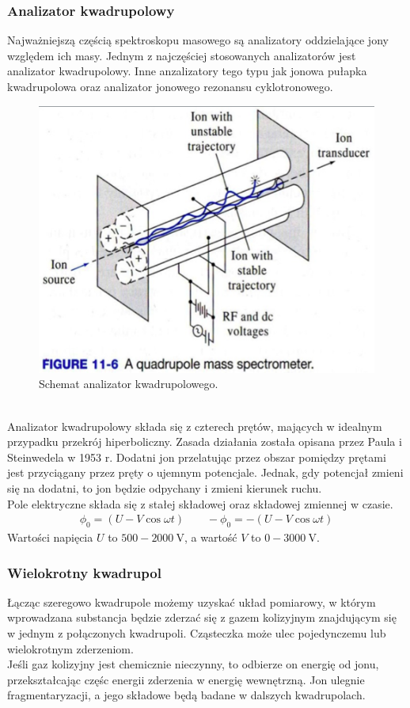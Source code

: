\documentclass[paper=a4, fontsize=12pt]{scrartcl}
\begin{document}
\subsubsection{Analizator kwadrupolowy}
Najważniejszą częścią spektroskopu masowego są analizatory oddzielające jony względem ich masy. Jednym z najczęściej stosowanych analizatorów jest analizator kwadrupolowy. Inne anzalizatory tego typu jak jonowa pułapka kwadrupolowa oraz analizator jonowego rezonansu cyklotronowego.
\begin{figure}[h!]
\centering
\includegraphics[width=0.48\linewidth]{quad}
\caption{Schemat analizator kwadrupolowego.}
\label{fig:quad}
\end{figure}\\
Analizator kwadrupolowy składa się z czterech prętów, mających w idealnym przypadku przekrój hiperboliczny. Zasada działania została opisana przez Paula i Steinwedela w 1953 r.
Dodatni jon przelatując przez obszar pomiędzy prętami jest przyciągany przez pręty o ujemnym potencjale. Jednak, gdy potencjał zmieni się na dodatni, to jon będzie odpychany i zmieni kierunek ruchu.\\
Pole elektryczne składa się z stałej składowej oraz składowej zmiennej w czasie.
\begin{align*}
\phi_0=(U-V\cos\omega t)\qquad -\phi_0=-(U-V\cos\omega t)
\end{align*}
Wartości napięcia $U$ to $500-2000\:\mathrm{V}$, a wartość $V$ to $0-3000\:\mathrm{V}$.
\subsubsection{Wielokrotny kwadrupol}
Łącząc szeregowo kwadrupole możemy uzyskać układ pomiarowy, w którym wprowadzana substancja będzie zderzać się z gazem kolizyjnym znajdującym się w jednym z połączonych kwadrupoli. Cząsteczka może ulec pojedynczemu lub wielokrotnym zderzeniom.\\

Jeśli gaz kolizyjny jest chemicznie nieczynny, to odbierze on energię od jonu, przekształcając częśc energii zderzenia w energię wewnętrzną. Jon ulegnie fragmentaryzacji, a jego składowe będą badane w dalszych kwadrupolach.\\
\end{document}
